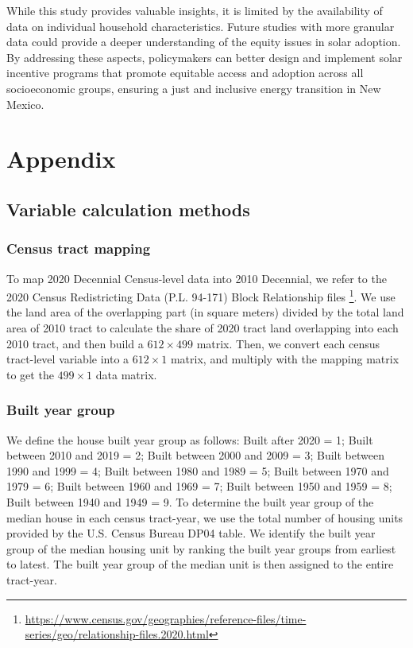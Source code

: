 \documentclass[11pt,twoside,letterpaper]{article}
\begin{document}
While this study provides valuable insights, it is limited by the availability of data on individual household characteristics. Future studies with more granular data could provide a deeper understanding of the equity issues in solar adoption. By addressing these aspects, policymakers can better design and implement solar incentive programs that promote equitable access and adoption across all socioeconomic groups, ensuring a just and inclusive energy transition in New Mexico.



\newpage
\appendix
{}
\section[Appendix]{Appendix}

\subsection{Variable calculation methods}
\label{subsec:Variable_Cal}
\subsubsection*{Census tract mapping}
To map 2020 Decennial Census-level data into 2010 Decennial, we refer to the 2020 Census Redistricting Data (P.L. 94-171) Block Relationship files \footnote{\url{https://www.census.gov/geographies/reference-files/time-series/geo/relationship-files.2020.html}}. We use the land area of the overlapping part (in square meters) divided by the total land area of 2010 tract to calculate the share of 2020 tract land overlapping into each 2010 tract, and then build a $612 \times 499$ matrix. Then, we convert each census tract-level variable into a $612 \times 1$ matrix, and multiply with the mapping matrix to get the $499 \times 1$ data matrix.

\subsubsection*{Built year group}
We define the house built year group as follows: Built after 2020 = 1; Built between 2010 and 2019 = 2; Built between 2000 and 2009 = 3; Built between 1990 and 1999 = 4; Built between 1980 and 1989 = 5; Built between 1970 and 1979 = 6; Built between 1960 and 1969 = 7; Built between 1950 and 1959 = 8; Built between 1940 and 1949 = 9. To determine the built year group of the median house in each census tract-year, we use the total number of housing units provided by the U.S. Census Bureau DP04 table. We identify the built year group  of the median housing unit by ranking the built year groups from earliest to latest. The built year group of the median unit is then assigned to the entire tract-year.
\end{document}
